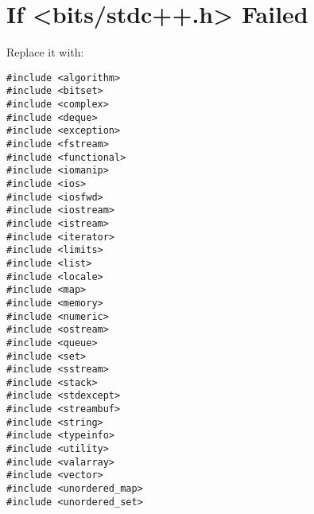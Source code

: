 \section{If <bits/stdc++.h> Failed}
Replace it with:
\begin{lstlisting}
#include <algorithm>
#include <bitset>
#include <complex>
#include <deque>
#include <exception>
#include <fstream>
#include <functional>
#include <iomanip>
#include <ios>
#include <iosfwd>
#include <iostream>
#include <istream>
#include <iterator>
#include <limits>
#include <list>
#include <locale>
#include <map>
#include <memory>
#include <numeric>
#include <ostream>
#include <queue>
#include <set>
#include <sstream>
#include <stack>
#include <stdexcept>
#include <streambuf>
#include <string>
#include <typeinfo>
#include <utility>
#include <valarray>
#include <vector>
#include <unordered_map>
#include <unordered_set>
\end{lstlisting}